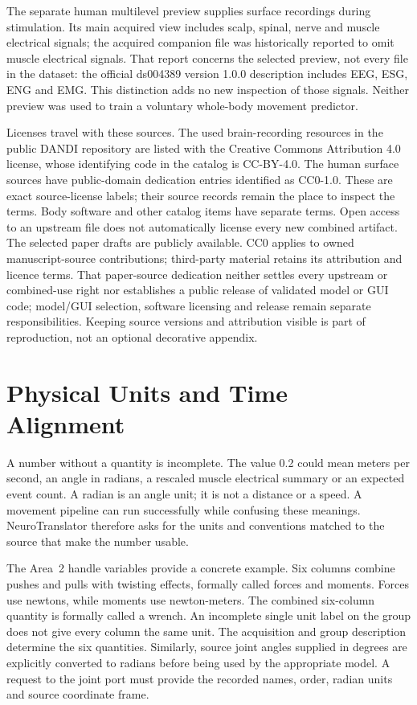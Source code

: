 The separate human multilevel preview supplies surface recordings during stimulation. Its main acquired view includes scalp, spinal, nerve and muscle electrical signals; the acquired companion file was historically reported to omit muscle electrical signals. That report concerns the selected preview, not every file in the dataset: the official ds004389 version 1.0.0 description includes EEG, ESG, ENG and EMG. This distinction adds no new inspection of those signals. Neither preview was used to train a voluntary whole-body movement predictor.\cite{spinal_dataset2023,spinal_companion2023}

Licenses travel with these sources. The used brain-recording resources in the public DANDI repository are listed with the Creative Commons Attribution 4.0 license, whose identifying code in the catalog is CC-BY-4.0. The human surface sources have public-domain dedication entries identified as CC0-1.0. These are exact source-license labels; their source records remain the place to inspect the terms. Body software and other catalog items have separate terms. Open access to an upstream file does not automatically license every new combined artifact. The selected paper drafts are publicly available. CC0 applies to owned manuscript-source contributions; third-party material retains its attribution and licence terms. That paper-source dedication neither settles every upstream or combined-use right nor establishes a public release of validated model or GUI code; model/GUI selection, software licensing and release remain separate responsibilities. Keeping source versions and attribution visible is part of reproduction, not an optional decorative appendix.

\section{Physical Units and Time Alignment}

A number without a quantity is incomplete. The value 0.2 could mean meters per second, an angle in radians, a rescaled muscle electrical summary or an expected event count. A radian is an angle unit; it is not a distance or a speed. A movement pipeline can run successfully while confusing these meanings. NeuroTranslator therefore asks for the units and conventions matched to the source that make the number usable.

The Area~2 handle variables provide a concrete example. Six columns combine pushes and pulls with twisting effects, formally called forces and moments. Forces use newtons, while moments use newton-meters. The combined six-column quantity is formally called a wrench. An incomplete single unit label on the group does not give every column the same unit. The acquisition and group description determine the six quantities. Similarly, source joint angles supplied in degrees are explicitly converted to radians before being used by the appropriate model. A request to the joint port must provide the recorded names, order, radian units and source coordinate frame.\cite{chowdhury2020}

